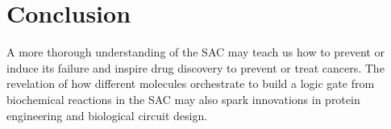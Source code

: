 \chapter{Conclusion}
\label{chpt:conclusion}

A more thorough understanding of the SAC may teach us how to prevent or induce its failure and inspire drug discovery to prevent or treat cancers. The revelation of how different molecules orchestrate to build a  logic gate from biochemical reactions in the SAC may also spark innovations in protein engineering and biological circuit design.